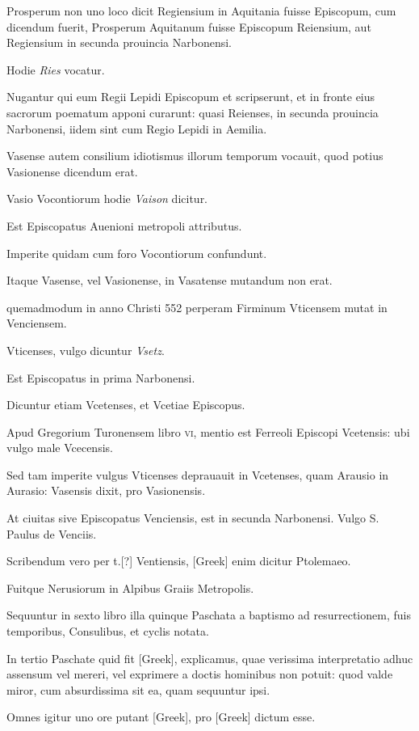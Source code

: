 \begin{parnumbers}
Prosperum non uno
loco dicit Regiensium in Aquitania fuisse Episcopum, cum dicendum
fuerit, Prosperum Aquitanum fuisse Episcopum Reiensium,
aut Regiensium in secunda prouincia Narbonensi.

Hodie \textit{Ries} vocatur.

Nugantur qui eum Regii Lepidi Episcopum et scripserunt,
et in fronte eius sacrorum poematum apponi curarunt: quasi Reienses,
in secunda prouincia Narbonensi, iidem sint cum Regio Lepidi
in Aemilia.

Vasense autem consilium idiotismus illorum temporum
vocauit, quod potius Vasionense dicendum erat.

Vasio Vocontiorum hodie \textit{Vaison} dicitur.

Est Episcopatus Auenioni metropoli
attributus.

Imperite quidam cum foro Vocontiorum confundunt.

Itaque Vasense, vel Vasionense, in Vasatense mutandum non
erat.

quemadmodum in anno Christi 552 perperam Firminum
Vticensem mutat in Venciensem.

Vticenses, vulgo dicuntur \textit{Vsetz}.

Est Episcopatus in prima Narbonensi.

Dicuntur etiam Vcetenses,
et Vcetiae Episcopus.

Apud Gregorium Turonensem libro \textsc{vi},
mentio est Ferreoli Episcopi Vcetensis: ubi vulgo male Vcecensis.

Sed tam imperite vulgus Vticenses deprauauit in Vcetenses, quam
Arausio in Aurasio: Vasensis dixit, pro Vasionensis.

At ciuitas sive
Episcopatus Venciensis, est in secunda Narbonensi. Vulgo S. Paulus
de Venciis.

Scribendum vero per t.[?] Ventiensis, \textgreek{[Greek]} enim dicitur
Ptolemaeo.

Fuitque Nerusiorum in Alpibus Graiis Metropolis.

Sequuntur in sexto libro illa quinque Paschata a baptismo
ad resurrectionem, fuis temporibus, Consulibus, et cyclis notata.

In tertio Paschate quid fit \textgreek{[Greek]}, explicamus,
quae verissima interpretatio adhuc assensum vel mereri, vel
exprimere a doctis hominibus non potuit: quod valde miror,
cum absurdissima sit ea, quam sequuntur ipsi.

Omnes igitur uno
ore putant \textgreek{[Greek]}, pro \textgreek{[Greek]} dictum esse.


\end{parnumbers}
